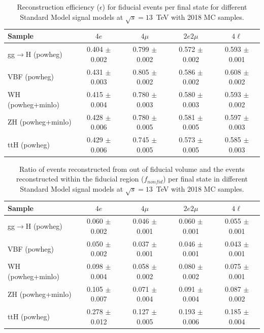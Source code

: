 \begin{table}[!h!tb]
\begin{center}
\small
\caption{
Reconstruction efficiency ($\epsilon$) for fiducial events per final state for different Standard Model signal models at $\sqrt{s} =  13$~TeV with 2018 MC samples.
\label{tab:efficiencySM}
}
\begin{tabular}{|l|c|c|c|c|} \hline
Sample & $4e$ & $4\mu$ & $2e2\mu$ & $4\ell$ \\ \hline
gg$\rightarrow$H ({\sc powheg})  & 0.404 $\pm$ 0.002 & 0.799 $\pm$ 0.002 & 0.572 $\pm$ 0.002 & 0.593 $\pm$ 0.001 \\
VBF ({\sc powheg})  & 0.431 $\pm$ 0.003 & 0.805 $\pm$ 0.002 & 0.586 $\pm$ 0.002 & 0.608 $\pm$ 0.002 \\
WH ({\sc powheg+minlo}) & 0.415 $\pm$ 0.004 & 0.780 $\pm$ 0.003 & 0.580 $\pm$ 0.003 & 0.593 $\pm$ 0.002 \\
ZH ({\sc powheg+minlo})  & 0.428 $\pm$ 0.006 & 0.780 $\pm$ 0.005 & 0.581 $\pm$ 0.005 & 0.597 $\pm$ 0.003 \\
ttH ({\sc powheg}) & 0.429 $\pm$ 0.006 & 0.745 $\pm$ 0.005 & 0.573 $\pm$ 0.005 & 0.585 $\pm$ 0.003 \\
\hline
\end{tabular}
\normalsize
\end{center}
\end{table}

\begin{table}[!h!tb]
\begin{center}
\small
\caption{
Ratio of events reconstructed from out of fiducial volume and the events reconstructed within the fiducial region ($f_{nonfid}$) per
 final state in different Standard Model signal models at $\sqrt{s} =  13$~TeV with 2018 MC samples.
\label{tab:foutSM}
}
\begin{tabular}{|l|c|c|c|c|} \hline
Sample & $4e$ & $4\mu$ & $2e2\mu$ & $4\ell$ \\ \hline
gg$\rightarrow$H ({\sc powheg})  & 0.060 $\pm$ 0.002 & 0.046 $\pm$ 0.001 & 0.060 $\pm$ 0.001 & 0.055 $\pm$ 0.001 \\
VBF ({\sc powheg})  & 0.050 $\pm$ 0.002 & 0.037 $\pm$ 0.001 & 0.046 $\pm$ 0.001 & 0.043 $\pm$ 0.001 \\
WH ({\sc powheg+minlo}) & 0.098 $\pm$ 0.004 & 0.058 $\pm$ 0.002 & 0.080 $\pm$ 0.002 & 0.075 $\pm$ 0.001 \\
ZH ({\sc powheg+minlo})  & 0.105 $\pm$ 0.007 & 0.071 $\pm$ 0.004 & 0.091 $\pm$ 0.004 & 0.087 $\pm$ 0.002 \\
ttH ({\sc powheg}) & 0.278 $\pm$ 0.012 & 0.127 $\pm$ 0.005 & 0.193 $\pm$ 0.006 & 0.185 $\pm$ 0.004 \\
\hline
\end{tabular}
\normalsize
\end{center}
\end{table}


